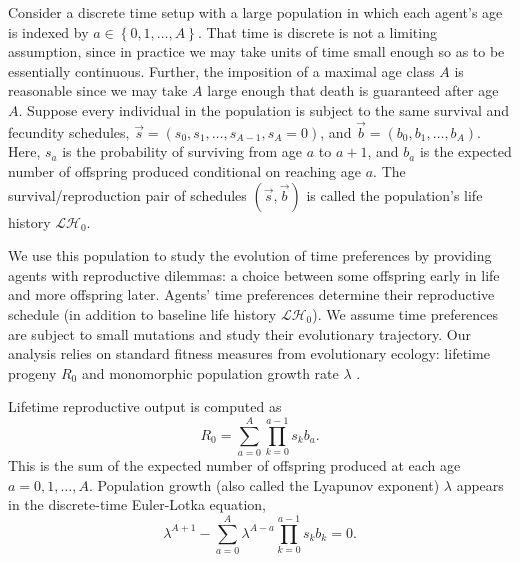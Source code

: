 \documentclass[titlepage, hidelinks, 12pt]{article}
\theoremstyle{plain}
\theoremstyle{remark}
\theoremstyle{definition}
\newcommand{\LH}{\mathcal{LH}}
\begin{document}
Consider a discrete time setup with a large population
in which each agent's age is indexed by $a\in\left\{ 0, 1, \ldots, A \right\}$. That time is discrete is
not a limiting assumption, since in practice we may take units of time small enough so as to be essentially continuous. Further, 
the imposition of a maximal age class $A$ is reasonable since we may take $A$ large enough that death is guaranteed after
age $A$. Suppose every individual in the population is subject to the same survival and fecundity
schedules, $\vec{s} = (s_0, s_1, \ldots, s_{A-1}, s_A = 0)$, and $\vec{b} = (b_0, b_1, \ldots, b_A)$. Here, 
$s_a$ is the probability of surviving from age $a$ to $a+1$, and $b_a$ is the expected
number of offspring produced conditional on reaching age $a$. 
The survival/reproduction pair of schedules $(\vec{s}, \vec{b})$
is called the population's life history $\LH_0$. 

We use this population to study the evolution of time preferences by providing agents with reproductive dilemmas: a choice
between some offspring early in life and more offspring later. Agents' time preferences determine their reproductive schedule
(in addition to baseline life history $\LH_0$). We assume 
time preferences are subject to small mutations and study their evolutionary trajectory. Our analysis relies on 
standard fitness measures from evolutionary ecology: lifetime progeny $R_0$ and monomorphic population growth rate $\lambda$ 
\cite{stearns92}.
 

Lifetime reproductive output is computed as
\begin{equation}
    R_0 = \sum\limits_{a = 0}^A \prod\limits_{k = 0}^{a-1} s_k b_a.
    \label{eqn:output}
\end{equation}
This is the sum of the expected number of offspring produced at each age $a= 0, 1, \ldots, A$. 
Population growth (also called the Lyapunov exponent) $\lambda$
appears in the discrete-time Euler-Lotka equation,
\begin{equation}
    \lambda^{A+1} - \sum\limits_{a = 0}^A \lambda^{A-a} \prod\limits_{k = 0}^{a-1}s_k b_k= 0.
    \label{eqn:euler-lotka}
\end{equation}
\end{document}

